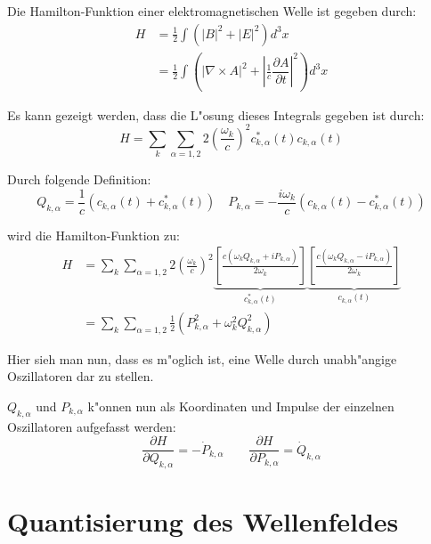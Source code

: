 Die Hamilton-Funktion einer elektromagnetischen Welle ist gegeben durch:
\begin{equation}
\begin{split}
H &= \frac{1}{2} \int (|B|^2 + |E|^2) d^3 x \\
	&= \frac{1}{2} \int \left(| \nabla\times A |^2 + \left| \frac{1}{c} \dfrac{\partial A}{\partial t} \right|^2 \right) d^3 x 
\end{split}
\end{equation}

Es kann gezeigt werden, dass die L"osung dieses Integrals gegeben ist durch:
\begin{equation}
H = \sum_k \sum_{\alpha=1,2} 2 \left(\frac{\omega_k}{c}\right)^2 c^*_{k,\alpha}(t) c_{k,\alpha}(t)
\end{equation}

Durch folgende Definition:
\begin{equation}
Q_{k,\alpha} = \frac{1}{c}(c_{k,\alpha}(t) + c^*_{k,\alpha}(t)) \quad P_{k,\alpha} = -\frac{i\omega_k}{c}(c_{k,\alpha}(t) - c^*_{k,\alpha}(t)) 
\end{equation}

wird die Hamilton-Funktion zu:
\begin{equation} \label{fq:hamilton}
\begin{split}
H &= \sum_k \sum_{\alpha=1,2} 2 \left(\frac{\omega_k}{c}\right)^2 \underbrace{\left[ \frac{c(\omega_k Q_{k,\alpha} + i P_{k,\alpha})}{2 \omega_k} \right]}_{c^*_{k,\alpha}(t)} \underbrace{\left[ \frac{c(\omega_k Q_{k,\alpha} - i P_{k,\alpha})}{2 \omega_k} \right]}_{c_{k,\alpha}(t)}\\
&= \sum_k \sum_{\alpha=1,2} \frac{1}{2} (P_{k,\alpha}^2 + \omega_k^2 Q_{k,\alpha}^2)
\end{split}
\end{equation}

Hier sieh man nun, dass es m"oglich ist, eine Welle durch unabh"angige Oszillatoren dar zu stellen.

$Q_{k,\alpha}$ und $P_{k,\alpha}$ k"onnen nun als Koordinaten und Impulse der einzelnen Oszillatoren aufgefasst werden:
\begin{equation}
\dfrac{\partial H}{\partial Q_{k,\alpha}} = -\dot{P}_{k,\alpha} \qquad \dfrac{\partial H}{\partial P_{k,\alpha}} = \dot{Q}_{k,\alpha}
\end{equation}

\section{Quantisierung des Wellenfeldes}

